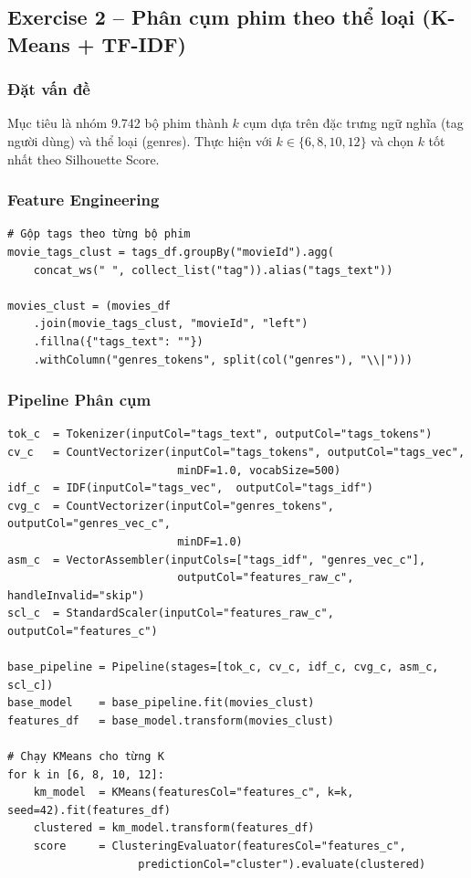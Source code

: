 \subsection{Exercise 2 -- Phân cụm phim theo thể loại (K-Means + TF-IDF)}

\subsubsection{Đặt vấn đề}

Mục tiêu là nhóm 9.742 bộ phim thành $k$ cụm dựa trên đặc trưng ngữ nghĩa (tag người dùng) và thể loại (genres). Thực hiện với $k \in \{6, 8, 10, 12\}$ và chọn $k$ tốt nhất theo Silhouette Score.

\subsubsection{Feature Engineering}

\begin{lstlisting}[style=PythonStyle, caption={Chuẩn bị đặc trưng cho bài toán phân cụm}]
# Gộp tags theo từng bộ phim
movie_tags_clust = tags_df.groupBy("movieId").agg(
    concat_ws(" ", collect_list("tag")).alias("tags_text"))

movies_clust = (movies_df
    .join(movie_tags_clust, "movieId", "left")
    .fillna({"tags_text": ""})
    .withColumn("genres_tokens", split(col("genres"), "\\|")))
\end{lstlisting}

\subsubsection{Pipeline Phân cụm}

\begin{lstlisting}[style=PythonStyle, caption={Feature pipeline dùng chung cho tất cả giá trị K}]
tok_c  = Tokenizer(inputCol="tags_text", outputCol="tags_tokens")
cv_c   = CountVectorizer(inputCol="tags_tokens", outputCol="tags_vec",
                          minDF=1.0, vocabSize=500)
idf_c  = IDF(inputCol="tags_vec",  outputCol="tags_idf")
cvg_c  = CountVectorizer(inputCol="genres_tokens", outputCol="genres_vec_c",
                          minDF=1.0)
asm_c  = VectorAssembler(inputCols=["tags_idf", "genres_vec_c"],
                          outputCol="features_raw_c", handleInvalid="skip")
scl_c  = StandardScaler(inputCol="features_raw_c", outputCol="features_c")

base_pipeline = Pipeline(stages=[tok_c, cv_c, idf_c, cvg_c, asm_c, scl_c])
base_model    = base_pipeline.fit(movies_clust)
features_df   = base_model.transform(movies_clust)

# Chạy KMeans cho từng K
for k in [6, 8, 10, 12]:
    km_model  = KMeans(featuresCol="features_c", k=k, seed=42).fit(features_df)
    clustered = km_model.transform(features_df)
    score     = ClusteringEvaluator(featuresCol="features_c",
                    predictionCol="cluster").evaluate(clustered)
\end{lstlisting}

